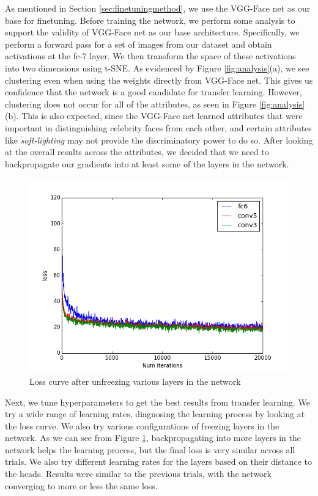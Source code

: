 \documentclass[10pt,twocolumn,letterpaper]{article}
\begin{document}
As mentioned in Section \ref{sec:finetuningmethod}, we use the VGG-Face net as our base for finetuning. Before training the network, we perform some analysis to support the validity of VGG-Face net as our base architecture. Specifically, we perform a forward pass for a set of images from our dataset and obtain activations at the fc-7 layer. We then transform the space of these activations into two dimensions using t-SNE. As evidenced by Figure \ref{fig:analysis}(a), we see clustering even when using the weights directly from VGG-Face net. This gives us confidence that the network is a good candidate for transfer learning. However, clustering does not occur for all of the attributes, as seen in Figure \ref{fig:analysis}(b). This is also expected, since the VGG-Face net learned attributes that were important in distinguishing celebrity faces from each other, and certain attributes like \textit{soft-lighting} may not provide the discriminatory power to do so. After looking at the overall results across the attributes, we decided that we need to backpropagate our gradients into at least some of the layers in the network.

\begin{figure}
  \includegraphics[width=\linewidth]{images/analysis/loss_history_trials.png}
  \caption{Loss curve after unfreezing various layers in the network}
  \label{fig:loss-hist}
\end{figure}

Next, we tune hyperparameters to get the best results from transfer learning. We try a wide range of learning rates, diagnosing the learning process by looking at the loss curve. We also try various configurations of freezing layers in the network. As we can see from Figure \ref{fig:loss-hist}, backpropagating into more layers in the network helps the learning process, but the final loss is very similar across all trials. We also try different learning rates for the layers based on their distance to the heads. Results were similar to the previous trials, with the network converging to more or less the same loss. 
\end{document}
